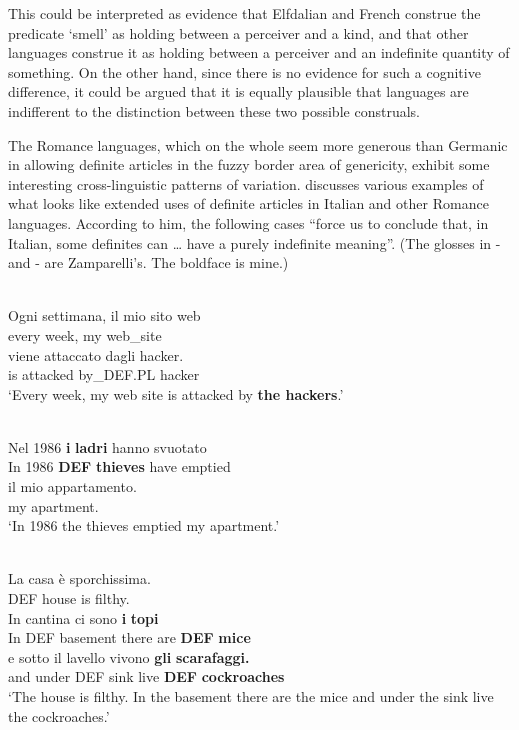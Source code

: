This could be interpreted as evidence that Elfdalian and French construe the predicate ‘smell’ as holding between a perceiver and a kind, and that other languages construe it as holding between a perceiver and an indefinite quantity of something. On the other hand, since there is no evidence for such a cognitive difference, it could be argued that it is equally plausible that languages are indifferent to the distinction between these two possible construals. 

The Romance languages, which on the whole seem more generous than Germanic in allowing definite articles in the fuzzy border area of genericity, exhibit some interesting cross-linguistic patterns of variation. \citet{Zamparelli2002} discusses various examples of what looks like extended uses of definite articles in Italian and other Romance languages. According to him, the following cases “force us to conclude that, in Italian, some definites can … have a purely indefinite meaning”. (The glosses in - and - are Zamparelli’s. The boldface is mine.)

\ea \label{} 
\\
\gll Ogni  settimana,  il mio  sito web\\
every  week,  my  web\_site\\
\gll viene  attaccato  dagli  hacker.\\
is  attacked  by\_DEF.PL  hacker\\
\glt ‘Every week, my web site is attacked by \textbf{the hackers}.’

\z

\ea \label{} 
\\
\gll Nel  1986  \textbf{i} \textbf{ladri} hanno  svuotato\\
In  1986  \textbf{DEF} \textbf{thieves} have  emptied\\
\gll il mio  appartamento.\\
my  apartment.\\
\glt ‘In 1986 the thieves emptied my apartment.’

\z

\ea \label{} 
\\
\gll La  casa  è  sporchissima.\\
DEF  house  is  filthy.\\
\gll In  cantina  ci  sono  \textbf{i} \textbf{topi}\\
In DEF  basement  there  are  \textbf{DEF} \textbf{mice}\\
\gll e  sotto  il  lavello  vivono  \textbf{gli} \textbf{scarafaggi.}\\
and  under  DEF  sink  live  \textbf{DEF} \textbf{cockroaches}\\
\glt ‘The house is filthy. In the basement there are the mice and under the sink live the cockroaches.’  

